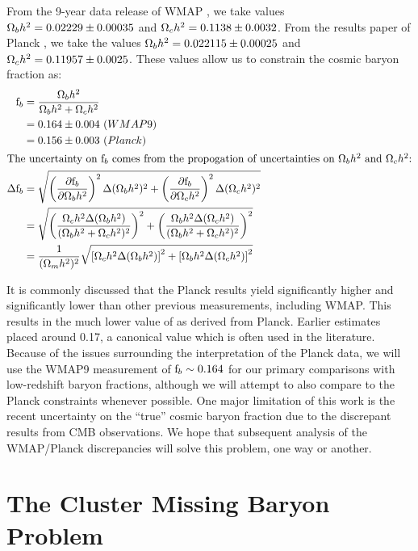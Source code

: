 From the 9-year data release of WMAP \citep[WMAP9,][]{Hinshaw2013}, we
take values $\Omega_b h^2 = 0.02229 \pm 0.00035$ and $\Omega_c h^2 =
0.1138 \pm 0.0032$. From the results paper of Planck
\citep{PlanckResultsXVI}, we take the values $\Omega_b h^2 = 0.022115
\pm 0.00025$ and $\Omega_c h^2 = 0.11957 \pm 0.0025$. These values
allow us to constrain the cosmic baryon fraction as:
\begin{align}
\textrm{f\ensuremath{_b}} &= \frac{\Omega_b h^2}{\Omega_b h^2 + \Omega_c h^2} \\
&=0.164 \pm 0.004 \,\,(WMAP9) \nonumber\\
&= 0.156 \pm 0.003\,\,(Planck) \nonumber\\ 
\intertext{The uncertainty on \textrm{f\ensuremath{_b}}{} comes from the propogation of
  uncertainties on $\Omega_b h^2$ and $\Omega_c h^2$:}
\Delta\textrm{f\ensuremath{_b}} &=
\sqrt{\left(\frac{\partial\textrm{f\ensuremath{_b}}}{\partial\Omega_b h^2}\right)^2\Delta(\Omega_b h^2)^2 
+ \left(\frac{\partial\textrm{f\ensuremath{_b}}}{\partial\Omega_c h^2}\right)^2\Delta(\Omega_c h^2)^2} \nonumber \\
&= \sqrt{\left(\frac{\Omega_c h^2 \Delta(\Omega_b h^2)}{(\Omega_b h^2 + \Omega_c h^2)^2}\right)^2
+ \left(\frac{\Omega_b h^2 \Delta(\Omega_c h^2)}{(\Omega_b h^2 + \Omega_c h^2)^2}\right)^2} \nonumber \\
&= \frac{1}{(\Omega_m h^2)^2}\sqrt{\left[\Omega_c h^2 \Delta(\Omega_b h^2)\right]^2
+ \left[\Omega_b h^2 \Delta(\Omega_c h^2)\right]^2} 
\end{align}

It is commonly discussed  that the Planck
results yield \omegam{} significantly higher and \Ho{} significantly
lower than other previous measurements, including WMAP. This results
in the much lower value of \fb{} as derived from Planck. Earlier
estimates \citep[e.g.,WMAP5,][]{Dunkley2009} placed \fb{}
around 0.17, a canonical value which is often used in the
literature. Because of the issues surrounding the interpretation of
the Planck data, we will use the WMAP9 measurement of $\textrm{f\ensuremath{_b}}{}\sim0.164$
for our primary comparisons with low-redshift baryon fractions,
although we will attempt to also compare to the Planck constraints
whenever possible. One major limitation of this work is the recent
uncertainty on the ``true'' cosmic baryon fraction due to the
discrepant results from CMB observations. We hope that subsequent
analysis of the WMAP/Planck discrepancies will solve this problem, one
way or another.



\section{The Cluster Missing Baryon Problem}
\label{sec:Missing.Clusters}

